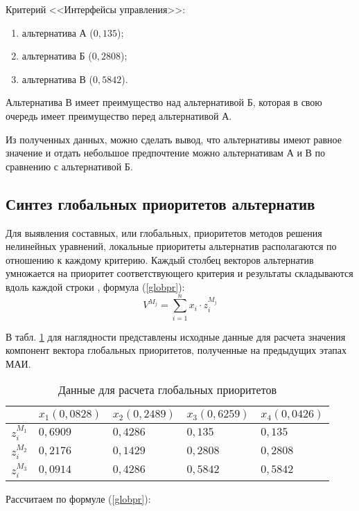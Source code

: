 Критерий <<Интерфейсы управления>>:
\begin{enumerate}
  \item альтернатива А ($0,135$);
  \item альтернатива Б ($0,2808$);
  \item альтернатива В ($0,5842$).
\end{enumerate}

Альтернатива В имеет преимущество над альтернативой Б, которая в свою очередь имеет преимущество перед альтернативой А.

Из полученных данных, можно сделать вывод, что альтернативы имеют равное значение и отдать небольшое предпочтение можно альтернативам А и В по сравнению с альтернативой Б.

\subsection{Синтез глобальных приоритетов альтернатив}

Для выявления составных, или глобальных, приоритетов методов решения нелинейных уравнений, локальные приоритеты альтернатив располагаются по отношению к каждому критерию.
Каждый столбец векторов альтернатив умножается на приоритет соответствующего критерия и результаты складываются вдоль каждой строки \cite{var-analyz}, формула (\ref{globpr}):
\begin{equation}\label{globpr}
V^{M_j} = \sum_{i = 1}^{n} x_i \cdot z_{i}^{M_j}
\end{equation}

В табл. \ref{globdata} для наглядности представлены исходные данные для расчета значения компонент вектора глобальных приоритетов, полученные на предыдущих этапах МАИ.
\begin{table}[H]
  \caption{Данные для расчета глобальных приоритетов}\label{globdata}
  \begin{tabular}{|l|l|l|l|l|}
  \hline  & $x_1 (0,0828)$ & $x_2 (0,2489)$ & $x_3 (0,6259)$ & $x_4 (0,0426)$ \\
  \hline $z_{i}^{M_1}$ & $0,6909$ & $0,4286$ & $0,135$ & $0,135$ \\
  \hline $z_{i}^{M_2}$ & $0,2176$ & $0,1429$ & $0,2808$ & $0,2808$ \\
  \hline $z_{i}^{M_3}$ & $0,0914$ & $0,4286$ & $0,5842$ & $0,5842$ \\
  \hline
  \end{tabular}
\end{table}

Рассчитаем по формуле (\ref{globpr}):

